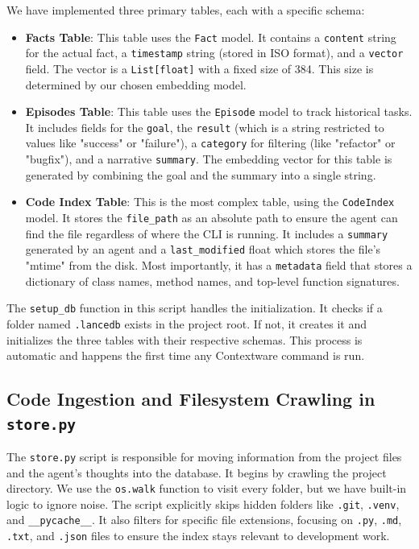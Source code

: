 \documentclass[conference]{IEEEtran}
\begin{document}
We have implemented three primary tables, each with a specific schema:
\begin{itemize}
   \item \textbf{Facts Table}: This table uses the \texttt{Fact} model. It contains a \texttt{content} string for the actual fact, a \texttt{timestamp} string (stored in ISO format), and a \texttt{vector} field. The vector is a \texttt{List[float]} with a fixed size of 384. This size is determined by our chosen embedding model.
    \item \textbf{Episodes Table}: This table uses the \texttt{Episode} model to track historical tasks. It includes fields for the \texttt{goal}, the \texttt{result} (which is a string restricted to values like "success" or "failure"), a \texttt{category} for filtering (like "refactor" or "bugfix"), and a narrative \texttt{summary}. The embedding vector for this table is generated by combining the goal and the summary into a single string.
    \item \textbf{Code Index Table}: This is the most complex table, using the \texttt{CodeIndex} model. It stores the \texttt{file\_path} as an absolute path to ensure the agent can find the file regardless of where the CLI is running. It includes a \texttt{summary} generated by an agent and a \texttt{last\_modified} float which stores the file's "mtime" from the disk. Most importantly, it has a \texttt{metadata} field that stores a dictionary of class names, method names, and top-level function signatures.
\end{itemize}

The \texttt{setup\_db} function in this script handles the initialization. It checks if a folder named \texttt{.lancedb} exists in the project root. If not, it creates it and initializes the three tables with their respective schemas. This process is automatic and happens the first time any Contextware command is run.

\subsection{Code Ingestion and Filesystem Crawling in \texttt{store.py}}
The \texttt{store.py} script is responsible for moving information from the project files and the agent's thoughts into the database. It begins by crawling the project directory. We use the \texttt{os.walk} function to visit every folder, but we have built-in logic to ignore noise. The script explicitly skips hidden folders like \texttt{.git}, \texttt{.venv}, and \texttt{\_\_pycache\_\_}. It also filters for specific file extensions, focusing on \texttt{.py}, \texttt{.md}, \texttt{.txt}, and \texttt{.json} files to ensure the index stays relevant to development work.
\end{document}
